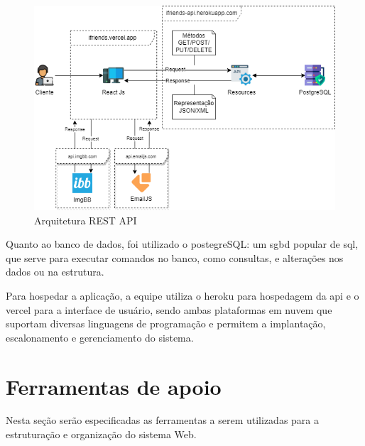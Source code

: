 \begin{figure}[htb]
\centering
\caption{Arquitetura REST API}
\label{Arquitetura_Rest_API}
\includegraphics[width=1.0\textwidth]{anexos/Imagens_Diagramas/Arquitetura-Rest-API.png}
\end{figure}
\FloatBarrier

Quanto ao banco de dados, foi utilizado o \gls{postegreSQL}: um \acs{sgbd} popular de \acs{sql}, que serve para executar comandos no banco, como consultas, e alterações nos dados ou na estrutura.

Para hospedar a aplicação, a equipe utiliza o \gls{heroku} para hospedagem da \acs{api} e o \gls{vercel} para a interface de usuário, sendo ambas plataformas em nuvem que suportam diversas linguagens de programação e permitem a implantação, escalonamento e gerenciamento do sistema.

\section{Ferramentas de apoio}
Nesta seção serão especificadas as ferramentas a serem utilizadas para a estruturação e organização do sistema Web.

